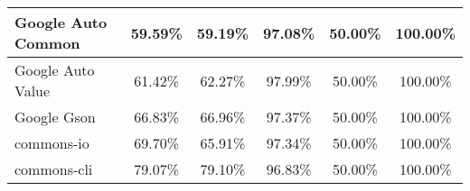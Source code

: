 \documentclass[../main]{subfiles}
\begin{document}
\begin{table}[htb]
\begin{tabular}{|l|c|c|c|c|c|}
Google Auto Common            & 59.59\%                                                                                 & 59.19\%                                                                                     & 97.08\%                                                                              & 50.00\%                                                                               & 100.00\%                                                                             \\ \hline
Google Auto Value             & 61.42\%                                                                                 & 62.27\%                                                                                     & 97.99\%                                                                              & 50.00\%                                                                               & 100.00\%                                                                             \\ \hline
Google Gson                   & 66.83\%                                                                                 & 66.96\%                                                                                     & 97.37\%                                                                              & 50.00\%                                                                               & 100.00\%                                                                             \\ \hline
commons-io                    & 69.70\%                                                                                 & 65.91\%                                                                                     & 97.34\%                                                                              & 50.00\%                                                                               & 100.00\%                                                                             \\ \hline
commons-cli                   & 79.07\%                                                                                 & 79.10\%                                                                                     & 96.83\%                                                                              & 50.00\%                                                                               & 100.00\%                                                                             \\ \hline

\end{tabular}
\end{table}
\end{document}
